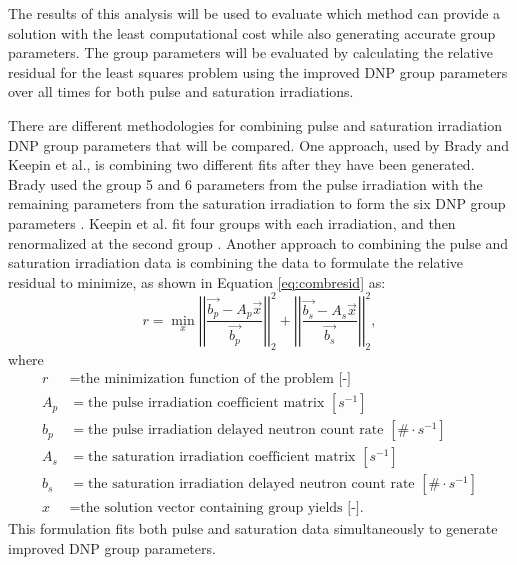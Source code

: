 The results of this analysis will be used to evaluate which method can provide a solution with the least computational cost while also generating accurate group parameters.
The group parameters will be evaluated by calculating the relative residual for the least squares problem using the improved \gls{DNP} group parameters over all times for both pulse and saturation irradiations.

There are different methodologies for combining pulse and saturation irradiation \gls{DNP} group parameters that will be compared.
One approach, used by Brady and Keepin et al., is combining two different fits after they have been generated.
Brady used the group 5 and 6 parameters from the pulse irradiation with the remaining parameters from the saturation irradiation to form the six \gls{DNP} group parameters \cite{brady1988evaluation}.
Keepin et al. fit four groups with each irradiation, and then renormalized at the second group \cite{keepin1957delayed}.
Another approach to combining the pulse and saturation irradiation data is combining the data to formulate the relative residual to minimize, as shown in Equation \eqref{eq:combresid} as:
\begin{equation}
    r = \min_x \left| \left| \frac{\vec{b_p} - A_p\vec{x}}{\vec{b_p}} \right| \right|_2^2 + \left| \left| \frac{\vec{b_s} - A_s\vec{x}}{\vec{b_s}} \right| \right|_2^2,
    \label{eq:combresid}
\end{equation}
where
\begin{align}
    r &= \text{the minimization function of the problem [-]} \nonumber \\
    A_p &= \text{the pulse irradiation coefficient matrix $[s^{-1}]$} \nonumber \\
    b_{p} &= \text{the pulse irradiation delayed neutron count rate $[\# \cdot s^{-1}]$} \nonumber \\
    A_s &= \text{the saturation irradiation coefficient matrix $[s^{-1}]$} \nonumber \\
    b_{s} &= \text{the saturation irradiation delayed neutron count rate $[\# \cdot s^{-1}]$} \nonumber \\
    x &= \text{the solution vector containing group yields [-].} \nonumber
\end{align}
This formulation fits both pulse and saturation data simultaneously to generate improved \gls{DNP} group parameters.

